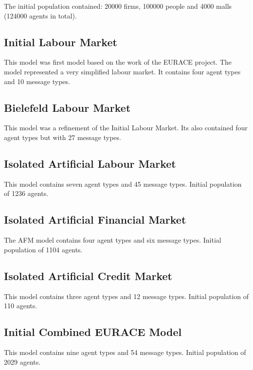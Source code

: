 The initial population contained: 20000 firms, 100000 people and 4000 malls (124000 agents in total).
\subsection{Initial Labour Market}
This model was first model based on the work of the EURACE project. The model represented a very simplified labour market. It contains four agent types and 10 message types.
\subsection{Bielefeld Labour Market}
This model was a refinement of the Initial Labour Market. Its also contained four agent types but with 27 message types.
\subsection{Isolated Artificial Labour Market}
This model contains seven agent types and 45 message types. Initial population of 1236 agents.
\subsection{Isolated Artificial Financial Market}
The AFM model contains four agent types and six message types. Initial population of 1104 agents.
\subsection{Isolated Artificial Credit Market}
This model contains three agent types and 12 message types. Initial population of 110 agents.
\subsection{Initial Combined EURACE Model}
This model contains nine agent types and 54 message types. Initial population of 2029 agents.